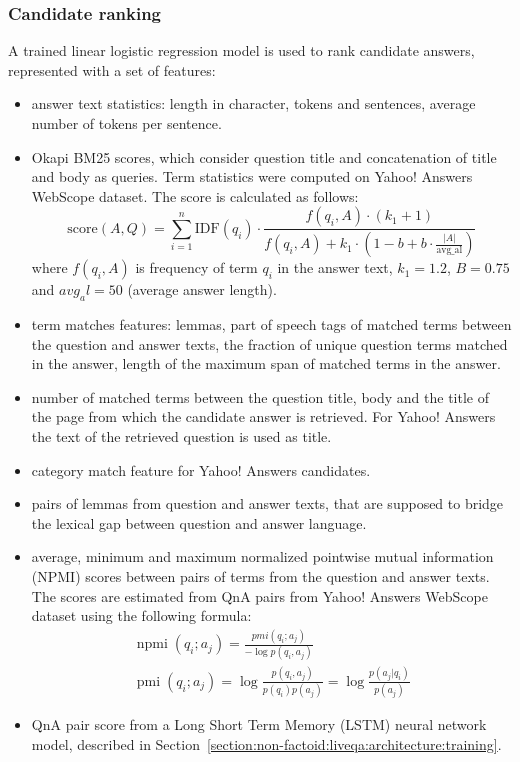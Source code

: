 \subsubsection{Candidate ranking}
\label{section:non-factoid:liveqa:architecture:ranking}

A trained linear logistic regression model is used to rank candidate answers, represented with a set of features:
\begin{itemize}
\item answer text statistics: length in character, tokens and sentences, average number of tokens per sentence.
\item Okapi BM25 scores, which consider question title and concatenation of title and body as queries. Term statistics were computed on Yahoo! Answers WebScope dataset. The score is calculated as follows:
\begin{equation*}
\label{equation:bm25}
\text{score}(A,Q) = \sum_{i=1}^{n} \text{IDF}(q_i) \cdot \frac{f(q_i, A) \cdot (k_1 + 1)}{f(q_i, A) + k_1 \cdot (1 - b + b \cdot \frac{|A|}{\text{avg\_al}})}
\end{equation*}
where $f(q_i, A)$ is frequency of term $q_i$ in the answer text, $k_1=1.2$, $B=0.75$ and $avg_al=50$ (average answer length).
\item term matches features: lemmas, part of speech tags of matched terms between the question and answer texts, the fraction of unique question terms matched in the answer, length of the maximum span of matched terms in the answer.
\item number of matched terms between the question title, body and the title of the page from which the candidate answer is retrieved. For Yahoo! Answers the text of the retrieved question is used as title.
\item category match feature for Yahoo! Answers candidates.
\item pairs of lemmas from question and answer texts, that are supposed to bridge the lexical gap between question and answer language.
\item average, minimum and maximum normalized pointwise mutual information (NPMI) scores between pairs of terms from the question and answer texts. The scores are estimated from QnA pairs from Yahoo! Answers WebScope dataset using the following formula:
\begin{equation*}
\begin{split}
\operatorname{npmi}(q_i;a_j) = \frac{pmi(q_i;a_j)}{-\log p(q_i,a_j)}\\
\operatorname{pmi}(q_i;a_j) = \log\frac{p(q_i,a_j)}{p(q_i)p(a_j)} =  \log\frac{p(a_j|q_i)}{p(a_j)}
\end{split}
\end{equation*}
\item QnA pair score from a Long Short Term Memory (LSTM) neural network model, described in Section~\ref{section:non-factoid:liveqa:architecture:training}.
\end{itemize}

